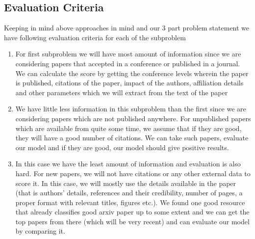 \documentclass[a4paper, 11pt]{article}
\begin{document}
\subsection{Evaluation Criteria}
Keeping in mind above approaches in mind and our 3 part problem statement we have following evaluation criteria for each of the subproblem
\begin{enumerate}
\item  For first subproblem we will have most amount of information since we are considering papers that accepted in a conference or published in a journal. We can calculate the score by getting the conference levels wherein the paper is published, citations of the paper, impact of the authors, affiliation details and other parameters which we will extract from the text of the paper

\item We have little less information in this subproblem than the first since we are considering papers which are not published anywhere. For unpublished papers which are available from quite some time, we assume that if they are good, they will have a good number of citations. We can take such papers, evaluate our model and if they are good, our model should give positive results.

\item In this case we have the least amount of information and evaluation is also hard. For new papers, we will not have citations or any other external data to score it. In this case, we will mostly use the details available in the paper (that is authors' details, references and their credibility, number of pages, a proper format with relevant titles, figures etc.). We found one good resource \cite{scirate}  that already classifies good arxiv paper up to some extent and we can get the top papers from there (which will be very recent) and can evaluate our model by comparing it.
\end{enumerate}
\end{document}
